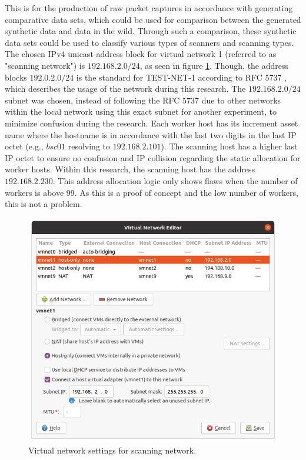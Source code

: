 This is for the production of raw packet captures in accordance with generating comparative data sets, which could be used for comparison between the generated synthetic data and data in the wild. Through such a comparison, these synthetic data sets could be used to classify various types of scanners and scanning types.
The chosen IPv4 unicast address block for virtual network 1 (referred to as "scanning network") is $192.168.2.0/24$, as seen in figure \ref{fig:VirtNetworkScanning}. 
Though, the address blocks $192.0.2.0/24$ is the standard for TEST-NET-1 according to RFC 5737 \autocite{rfc5737}, which describes the usage of the network during this research.
The $192.168.2.0/24$ subnet was chosen, instead of following the RFC 5737 due to other networks within the local network using this exact subnet for another experiment, to minimize confusion during the research.
Each worker host has its increment asset name where the hostname is in accordance with the last two digits in the last IP octet (e.g., $bsc01$ resolving to $192.168.2.101$). The scanning host has a higher last IP octet to ensure no confusion and IP collision regarding the static allocation for worker hosts. Within this research, the scanning host has the address $192.168.2.230$. This address allocation logic only shows flaws when the number of workers is above 99. As this is a proof of concept and the low number of workers, this is not a problem.
\begin{figure}[htbp]
\centerline{\includegraphics[scale=0.4]{images/lab/vmnet1.png}}
\caption{Virtual network settings for scanning network.}
\label{fig:VirtNetworkScanning}
\end{figure}

